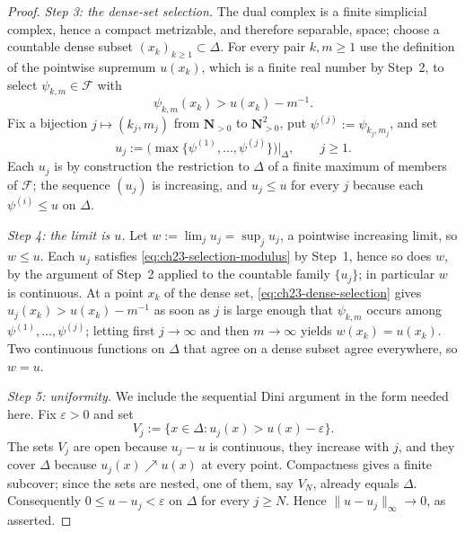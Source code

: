 \begin{proof}
\emph{Step 3: the dense-set selection.}
The dual complex is a finite simplicial complex, hence a compact metrizable,
and therefore separable, space; choose a countable dense subset
\((x_k)_{k\geq1}\subset\Delta\).  For every pair \(k,m\geq1\) use the
definition of the pointwise supremum \(u(x_k)\), which is a finite real
number by Step~2, to select \(\psi_{k,m}\in\mathcal F\) with
\begin{equation}\label{eq:ch23-dense-selection}
                     \psi_{k,m}(x_k)>u(x_k)-m^{-1}.
\end{equation}
Fix a bijection \(j\mapsto(k_j,m_j)\) from \(\mathbf N_{>0}\) to
\(\mathbf N_{>0}^2\), put \(\psi^{(j)}:=\psi_{k_j,m_j}\), and set
\begin{equation}\label{eq:ch23-selection-finite-maxima}
 u_j:=\bigl(\max\{\psi^{(1)},\ldots,\psi^{(j)}\}\bigr)\big|_\Delta,
 \qquad j\geq1 .
\end{equation}
Each \(u_j\) is by construction the restriction to \(\Delta\) of a finite
maximum of members of \(\mathcal F\); the sequence \((u_j)\) is increasing,
and \(u_j\leq u\) for every \(j\) because each \(\psi^{(i)}\leq u\) on
\(\Delta\).

\emph{Step 4: the limit is \(u\).}
Let \(w:=\lim_ju_j=\sup_ju_j\), a pointwise increasing limit, so
\(w\leq u\).  Each \(u_j\) satisfies \eqref{eq:ch23-selection-modulus} by
Step~1, hence so does \(w\), by the argument of Step~2 applied to the
countable family \(\{u_j\}\); in particular \(w\) is continuous.  At a point
\(x_k\) of the dense set, \eqref{eq:ch23-dense-selection} gives
\(u_j(x_k)>u(x_k)-m^{-1}\) as soon as \(j\) is large enough that
\(\psi_{k,m}\) occurs among \(\psi^{(1)},\ldots,\psi^{(j)}\); letting first
\(j\to\infty\) and then \(m\to\infty\) yields \(w(x_k)=u(x_k)\).  Two
continuous functions on \(\Delta\) that agree on a dense subset agree
everywhere, so \(w=u\).

\emph{Step 5: uniformity.}
We include the sequential Dini argument in the form needed here.  Fix
\(\varepsilon>0\) and set
\[
 V_j:=\{x\in\Delta:u_j(x)>u(x)-\varepsilon\}.
\]
The sets \(V_j\) are open because \(u_j-u\) is continuous, they increase
with \(j\), and they cover \(\Delta\) because \(u_j(x)\nearrow u(x)\) at
every point.  Compactness gives a finite subcover; since the sets are nested,
one of them, say \(V_N\), already equals \(\Delta\).  Consequently
\(0\leq u-u_j<\varepsilon\) on \(\Delta\) for every \(j\geq N\).  Hence
\(\|u-u_j\|_\infty\to0\), as asserted.
\end{proof}
